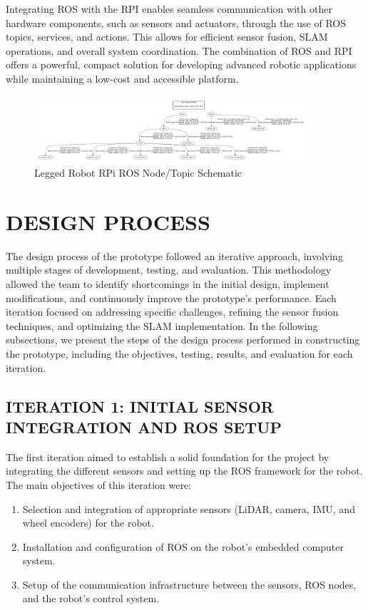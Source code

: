 \documentclass[12pt]{article}
\begin{document}
Integrating ROS with the RPI enables seamless communication with other hardware components, such as sensors and actuators, through the use of ROS topics, services, and actions. This allows for efficient sensor fusion, SLAM operations, and overall system coordination. The combination of ROS and RPI offers a powerful, compact solution for developing advanced robotic applications while maintaining a low-cost and accessible platform.

\begin{figure}[h]
    \centering
    \includegraphics[width=0.9\textwidth]{rpi_ros_graph.png}
    \caption{Legged Robot RPi ROS Node/Topic Schematic}
\end{figure}


\section{DESIGN PROCESS}

The design process of the prototype followed an iterative approach, involving multiple stages of development, testing, and evaluation. This methodology allowed the team to identify shortcomings in the initial design, implement modifications, and continuously improve the prototype's performance. Each iteration focused on addressing specific challenges, refining the sensor fusion techniques, and optimizing the SLAM implementation. In the following subsections, we present the steps of the design process performed in constructing the prototype, including the objectives, testing, results, and evaluation for each iteration.

\subsection{ITERATION 1: INITIAL SENSOR INTEGRATION AND ROS SETUP}

The first iteration aimed to establish a solid foundation for the project by integrating the different sensors and setting up the ROS framework for the robot. The main objectives of this iteration were:

\begin{enumerate}
    \item Selection and integration of appropriate sensors (LiDAR, camera, IMU, and wheel encoders) for the robot.
    \item Installation and configuration of ROS on the robot's embedded computer system.
    \item Setup of the communication infrastructure between the sensors, ROS nodes, and the robot's control system.
\end{enumerate}
\end{document}
